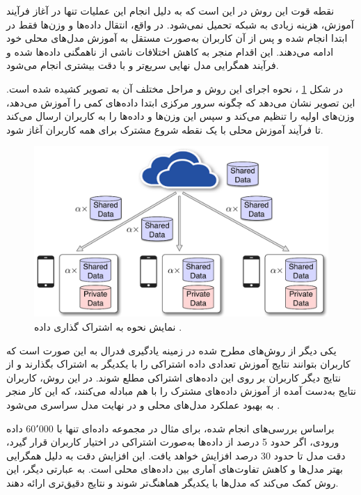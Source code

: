 نقطه قوت این روش در این است که به دلیل انجام این عملیات تنها در آغاز فرآیند آموزش، هزینه زیادی به شبکه تحمیل نمی‌شود. در واقع، انتقال داده‌ها و وزن‌ها فقط در ابتدا انجام شده و پس از آن کاربران به‌صورت مستقل به آموزش مدل‌های محلی خود ادامه می‌دهند. این اقدام منجر به کاهش اختلافات ناشی از ناهمگنی داده‌ها شده و فرآیند همگرایی مدل نهایی سریع‌تر و با دقت بیشتری انجام می‌شود.

در شکل
\ref{share_data}%
، نحوه اجرای این روش و مراحل مختلف آن به تصویر کشیده شده است. این تصویر نشان می‌دهد که چگونه سرور مرکزی ابتدا داده‌های کمی را آموزش می‌دهد، وزن‌های اولیه را تنظیم می‌کند و سپس این وزن‌ها و داده‌ها را به کاربران ارسال می‌کند تا فرآیند آموزش محلی با یک نقطه شروع مشترک برای همه کاربران آغاز شود.


\begin{figure}[b!]
	\centering
	\includegraphics[scale=0.9]{images/chap3/share_data.png}%
	\caption{%
		نمایش نحوه به اشتراک‌ گذاری داده
		\cite{zhao2018federated}%
		.
	}
	\label{share_data}
	\centering
\end{figure}


یکی دیگر از روش‌های مطرح شده در زمینه یادگیری فدرال به این صورت است که کاربران بتوانند نتایج آموزش تعدادی داده اشتراکی را با یکدیگر به اشتراک بگذارند و از نتایج دیگر کاربران بر روی این داده‌های اشتراکی مطلع شوند. در این روش، کاربران نتایج به‌دست آمده از آموزش داده‌های مشترک را با هم مبادله می‌کنند، که این کار منجر به بهبود عملکرد مدل‌های محلی و در نهایت مدل سراسری می‌شود
\cite{collins2021exploiting}.

براساس بررسی‌های انجام شده، برای مثال در مجموعه داده‌ای تنها با 60٬000 داده ورودی، اگر حدود 5 درصد از داده‌ها به‌صورت اشتراکی در اختیار کاربران قرار گیرد، دقت مدل تا حدود 30 درصد افزایش خواهد یافت. این افزایش دقت به دلیل همگرایی بهتر مدل‌ها و کاهش تفاوت‌های آماری بین داده‌های محلی است. به عبارتی دیگر، این روش کمک می‌کند که مدل‌ها با یکدیگر هماهنگ‌تر شوند و نتایج دقیق‌تری ارائه دهند.

